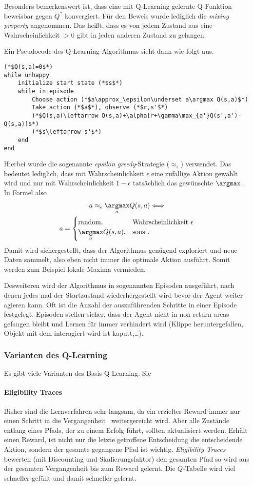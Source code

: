 \documentclass[ngerman]{../LaTeX-Templates/Paper/paper}
\newcommand{\enqo}[1]{\glqq #1\grqq\ }
\begin{document}
Besonders bemerkenswert ist, dass eine mit Q-Learning gelernte Q-Funktion beweisbar gegen $Q^\ast$ konvergiert. Für den Beweis wurde lediglich die \emph{mixing property} angenommen. Das heißt, dass es von jedem Zustand aus eine Wahrscheinlichkeit $>0$ gibt in jeden anderen Zustand zu gelangen.

Ein Pseudocode des Q-Learning-Algorithmus sieht dann wie folgt aus.
\begin{lstlisting}
(*$Q(s,a)=0$*)
while unhappy
	initialize start state (*$s$*)
	while in episode
		Choose action (*$a\approx_\epsilon\underset a\argmax Q(s,a)$*)
		Take action (*$a$*), observe (*$r,s'$*)
		(*$Q(s,a)\leftarrow Q(s,a)+\alpha[r+\gamma\max_{a'}Q(s',a')-Q(s,a)]$*)
		(*$s\leftarrow s'$*)
	end
end\end{lstlisting}
Hierbei wurde die sogenannte \emph{epsilon greedy}-Strategie ($\approx_\epsilon$) verwendet. Das bedeutet lediglich, dass mit Wahrscheinlichkeit $\epsilon$ eine zufällige Aktion gewählt wird und nur mit Wahrscheinlichkeit $1-\epsilon$ tatsächlich das gewünschte $\argmax$. In Formel also
\begin{gather*}
	a\approx_\epsilon \underset a\argmax Q(s,a)\Longleftrightarrow\\ a=\begin{cases}
		\text{random},&\text{Wahrscheinlichkeit }\epsilon\\
		\underset a\argmax Q(s,a),&\text{sonst.}
	\end{cases}
\end{gather*}
Damit wird sichergestellt, dass der Algorithmus genügend exploriert und neue Daten sammelt, also eben nicht immer die optimale Aktion ausführt. Somit werden zum Beispiel lokale Maxima vermieden.

Desweiteren wird der Algorithmus in sogenannten Episoden ausgeführt, nach denen jedes mal der Startzustand wiederhergestellt wird bevor der Agent weiter agieren kann. Oft ist die Anzahl der auszuführenden Schritte in einer Episode festgelegt. Episoden stellen sicher, dass der Agent nicht in non-return areas gefangen bleibt und Lernen für immer verhindert wird (Klippe heruntergefallen, Objekt mit dem interagiert wird ist kaputt,\ldots).

\subsubsection{Varianten des Q-Learning}
Es gibt viele Varianten des Basis-Q-Learning. Sie
\paragraph{Eligibility Traces}
Bisher sind die Lernverfahren sehr langsam, da ein erzielter Reward immer nur einen Schritt \enqo{in die Vergangenheit} weitergereicht wird.
Aber alle Zustände entlang eines Pfads, der zu einem Erfolg führt, sollten aktualisiert werden. Erhält einen Reward, ist nicht nur die letzte getroffene Entscheidung die entscheidende Aktion, sondern der gesamte gegangene Pfad ist wichtig.
\emph{Eligibility Traces} bewerten (mit Discounting und Skalierungsfaktor) den gesamten Pfad so wird aus der gesamten Vergangenheit bis zum Reward gelernt. Die $Q$-Tabelle wird viel schneller gefüllt und damit schneller gelernt.
\end{document}
